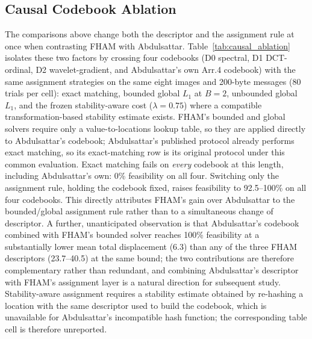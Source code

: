 \documentclass[preprint,12pt]{elsarticle}
\theoremstyle{plain}
\begin{document}
\begin{table}[!t]
\centering
\caption{Stability-Aware Lambda Sweep ($B=8$, Length 100)}
\label{tab:stability_lambda}

\end{table}

\begin{table}[!t]
\centering
\small
\caption{Transfer of the Stability Weight to the Scene Holdout}
\label{tab:lambda_transfer}
\resizebox{\linewidth}{!}{}
\end{table}

\subsection{Causal Codebook Ablation}

The comparisons above change both the descriptor and the assignment rule at
once when contrasting FHAM with Abdulsattar. Table~\ref{tab:causal_ablation}
isolates these two factors by crossing four codebooks (D0 spectral, D1
DCT-ordinal, D2 wavelet-gradient, and Abdulsattar's own Arr.4 codebook) with
the same assignment strategies on the same eight images and 200-byte
messages (80 trials per cell): exact matching, bounded global $L_1$ at
$B=2$, unbounded global $L_1$, and the frozen stability-aware cost
($\lambda=0.75$) where a compatible transformation-based stability estimate
exists. FHAM's bounded and global solvers require only a value-to-locations
lookup table, so they are applied directly to Abdulsattar's codebook; Abdulsattar's published protocol already performs exact
matching, so its exact-matching row is its original protocol under this
common evaluation. Exact matching fails on \emph{every} codebook at this
length, including Abdulsattar's own: 0\% feasibility on all four. Switching only
the assignment rule, holding the codebook fixed, raises feasibility to
92.5--100\% on all four codebooks. This directly attributes FHAM's gain over
Abdulsattar to the bounded/global assignment rule rather than to a
simultaneous change of descriptor. A further, unanticipated observation is
that Abdulsattar's codebook combined with FHAM's bounded solver reaches 100\%
feasibility at a substantially lower mean total displacement (6.3) than any of
the three FHAM descriptors (23.7--40.5) at the same bound; the two
contributions are therefore complementary rather than redundant, and
combining Abdulsattar's descriptor with FHAM's assignment layer is a natural
direction for subsequent study. Stability-aware assignment requires a
stability estimate obtained by
re-hashing a location with the same descriptor used to build the codebook,
which is unavailable for Abdulsattar's incompatible hash function; the
corresponding table cell is therefore unreported.
\end{document}
